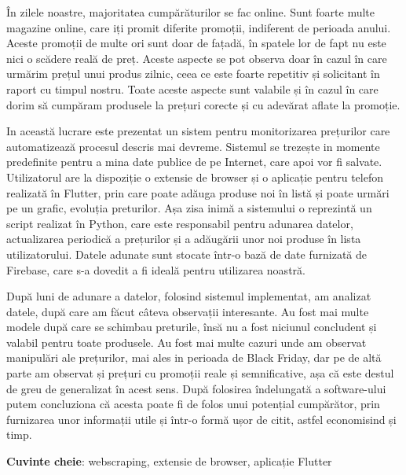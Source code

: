 În zilele noastre, majoritatea cumpărăturilor se fac online. Sunt foarte multe magazine online, care iți promit diferite promoții, indiferent de perioada anului. Aceste promoții de multe ori sunt doar de fațadă, în spatele lor de fapt nu este nici o scădere reală de preț. Aceste aspecte se pot observa doar în cazul în care urmărim prețul unui produs zilnic, ceea ce este foarte repetitiv și solicitant în raport cu timpul nostru. Toate aceste aspecte sunt valabile și în cazul în care dorim să cumpăram produsele la prețuri corecte și cu adevărat aflate la promoție. 

In această lucrare este prezentat un sistem pentru monitorizarea prețurilor care automatizează procesul descris mai devreme. Sistemul se trezește in momente predefinite pentru a mina date publice de pe Internet, care apoi vor fi salvate. Utilizatorul are la dispoziție o extensie de browser și o aplicație pentru telefon realizată în Flutter, prin care poate adăuga produse noi în listă și poate urmări pe un grafic, evoluția preturilor. Așa zisa inimă a sistemului o reprezintă un script realizat în Python, care este responsabil pentru adunarea datelor, actualizarea periodică a prețurilor și a adăugării unor noi produse în lista utilizatorului. Datele adunate sunt stocate într-o bază de date furnizată de Firebase, care s-a dovedit a fi ideală pentru utilizarea noastră. 

După luni de adunare a datelor, folosind sistemul implementat, am analizat datele, după care am făcut câteva observații interesante. Au fost mai multe modele după care se schimbau preturile, însă nu a fost niciunul concludent și valabil pentru toate produsele. Au fost mai multe cazuri unde am observat manipulări ale prețurilor, mai ales in perioada de Black Friday, dar pe de altă parte am observat și prețuri cu promoții reale și semnificative, așa că este destul de greu de generalizat în acest sens. După folosirea îndelungată a software-ului putem concluziona că acesta poate fi de folos unui potențial cumpărător, prin furnizarea unor informații utile și într-o formă ușor de citit, astfel economisind și timp. 

\textbf{Cuvinte cheie}: webscraping, extensie de browser, aplicație Flutter